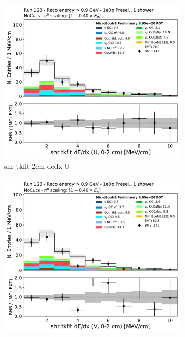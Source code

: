 \begin{figure}[H]
    \centering
    \begin{subfigure}{0.3\textwidth}
    \includegraphics[width=1.0\textwidth]{1e0p/High_E_Sideband/shr_tkfit_2cm_dedx_U.pdf}
    \caption{shr tkfit 2cm dedx U}
    \end{subfigure}
    \begin{subfigure}{0.3\textwidth}
    \includegraphics[width=1.0\textwidth]{1e0p/High_E_Sideband/shr_tkfit_2cm_dedx_V.pdf}

\end{subfigure}
\end{figure}
